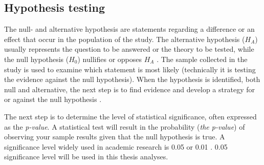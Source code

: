 


\subsection{Hypothesis testing}\label{sec:hypothesistesting}
The null- and alternative hypothesis are statements regarding a difference or an effect that occur in the population of the study. The alternative hypothesis ($H_A$) usually represents the question to be answered or the theory to be tested, while the null hypothesis ($H_{0}$) nullifies or opposes $H_A$ \citep{Walpole2012}. The sample collected in the study is used to examine which statement is most likely (technically it is testing the evidence against the null hypothesis).  When the hypothesis is identified, both null and alternative, the next step is to find evidence and develop a strategy for or against the null hypothesis \citep{LundResearchLtd2013}.

The next step is to determine the level of statistical significance, often expressed as the \textit{p-value}. A statistical test will result in the probability (\textit{the p-value}) of observing your sample results given that the null hypothesis is true. A significance level widely used in academic research is 0.05 or 0.01 \citep{Walpole2012}. 0.05 significance level will be used in this thesis analyses.


